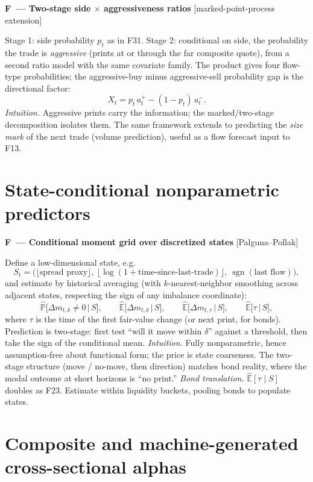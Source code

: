 \documentclass[11pt]{article}
\newcommand{\E}{\mathbb{E}}
\newcommand{\Prob}{\mathbb{P}}
\newcommand{\sgn}{\operatorname{sgn}}
\newcounter{fac}
\newcommand{\factor}[2]{%
  \refstepcounter{fac}%
  \par\medskip\noindent\textbf{F\thefac\ --- #1} \hfill {\small[#2]}\par\nopagebreak}
\begin{document}
\factor{Two-stage side $\times$ aggressiveness ratios}{marked-point-process extension}
Stage 1: side probability $p_t$ as in F31. Stage 2: conditional on side, the probability the trade is \emph{aggressive} (prints at or through the far composite quote), from a second ratio model with the same covariate family. The product gives four flow-type probabilities; the aggressive-buy minus aggressive-sell probability gap is the directional factor:
\[
X_t = p_t\, a^{+}_t - (1-p_t)\, a^{-}_t .
\]
\emph{Intuition.} Aggressive prints carry the information; the marked/two-stage decomposition isolates them. The same framework extends to predicting the \emph{size mark} of the next trade (volume prediction), useful as a flow forecast input to F13.

\section{State-conditional nonparametric predictors}\label{sec:state}

\factor{Conditional moment grid over discretized states}{Palguna--Pollak}
Define a low-dimensional state, e.g.
\[
S_t = \Big( \big\lfloor \text{spread proxy} \big\rfloor,\ \big\lfloor \log(1+\text{time-since-last-trade}) \big\rfloor,\ \sgn(\text{last flow}) \Big),
\]
and estimate by historical averaging (with $k$-nearest-neighbor smoothing across adjacent states, respecting the sign of any imbalance coordinate):
\[
\widehat{\Prob}\big[\Delta m_{t,\delta} \neq 0 \,\big|\, S\big],\qquad
\widehat{\E}\big[\Delta m_{t,\delta} \,\big|\, S\big],\qquad
\widehat{\E}\big[\Delta m_{t,\tau} \,\big|\, S\big],\qquad
\widehat{\E}\big[\tau \,\big|\, S\big],
\]
where $\tau$ is the time of the first fair-value change (or next print, for bonds). Prediction is two-stage: first test ``will it move within $\delta$'' against a threshold, then take the sign of the conditional mean.
\emph{Intuition.} Fully nonparametric, hence assumption-free about functional form; the price is state coarseness. The two-stage structure (move / no-move, then direction) matches bond reality, where the modal outcome at short horizons is ``no print.''
\emph{Bond translation.} $\widehat{\E}[\tau\mid S]$ doubles as F23. Estimate within liquidity buckets, pooling bonds to populate states.

\section{Composite and machine-generated cross-sectional alphas}\label{sec:mined}
\end{document}
